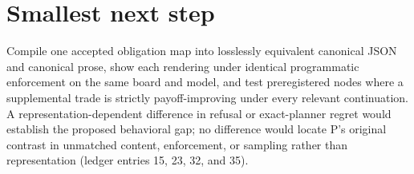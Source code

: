 \documentclass{article}
\begin{document}
\section{Smallest next step}
Compile one accepted obligation map into losslessly equivalent canonical JSON
and canonical prose, show each rendering under identical programmatic
enforcement on the same board and model, and test preregistered nodes where a
supplemental trade is strictly payoff-improving under every relevant
continuation. A representation-dependent difference in refusal or exact-planner
regret would establish the proposed behavioral gap; no difference would locate
P's original contrast in unmatched content, enforcement, or sampling rather
than representation (ledger entries 15, 23, 32, and 35).
\end{document}
